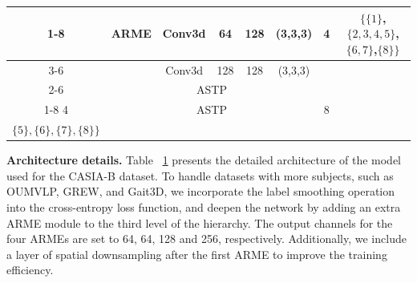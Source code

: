 \documentclass[10pt,twocolumn,letterpaper]{article}
\begin{document}
\begin{table}[bt]
{\begin{tabular}{c|ccccc|c|c}
\cline{1-8}       \multicolumn{1}{c|}{\multirow{3}[1]{*}{3}}   & \multicolumn{1}{c|}{\multirow{2}[1]{*}{ARME}} & \multicolumn{1}{c|}{Conv3d} & \multicolumn{1}{c|}{64} & \multicolumn{1}{c|}{128} & (3,3,3) & \multirow{3}[1]{*}{4} & \multirow{3}[1]{*}{$\{\{1\}$,$\{2,3,4,5\}$,$\{6,7\}$,$\{8\}\}$} \\
\cline{3-6}          & \multicolumn{1}{c|}{} & \multicolumn{1}{c|}{Conv3d} & \multicolumn{1}{c|}{128} & \multicolumn{1}{c|}{128} & (3,3,3) &       &  \\
\cline{2-6}          & \multicolumn{5}{c|}{ASTP}             &       &  \\
\cline{1-8}      4    & \multicolumn{5}{c|}{ASTP}             & 8    & \makecell[c]{$\{\{1\},\{2\},\{3\},\{4\},$\\$\{5\},\{6\},\{7\},\{8\}\}$} \\
\bottomrule    \end{tabular}%
}
  \label{tab:pcb-str}%
\end{table}%


\vspace{-0.13cm}
\noindent \textbf{Architecture details.} Table ~\ref{tab:pcb-str} presents the detailed architecture of the model used for the CASIA-B dataset. To handle datasets with more subjects, such as OUMVLP, GREW, and Gait3D, we incorporate the label smoothing operation into the cross-entropy loss function, and deepen the network by adding an extra ARME module to the third level of the hierarchy. The output channels for the four ARMEs are set to 64, 64, 128 and 256, respectively.
Additionally, we include a layer of spatial downsampling after the first ARME to improve the training efficiency.



\end{document}
